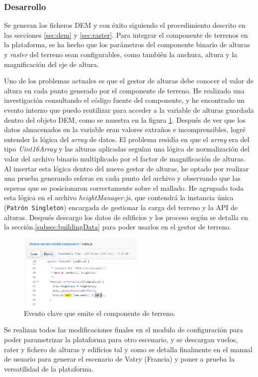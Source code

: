 \documentclass[a4paper, 11pt]{book}
\begin{document}
\subsubsection{Desarrollo}
Se generan los ficheros \textsc{DEM} y \emph{} con éxito siguiendo el procedimiento descrito en las secciones \ref{sec:dem} y \ref{sec:raster}. 
Para integrar el componente de terrenos en la plataforma, se ha hecho que los parámetros del componente binario de alturas y \emph{raster} del terreno sean configurables, como también la anchura, altura y la magnificación del eje de altura.

Uno de los problemas actuales es que el gestor de alturas debe conocer el valor de altura en cada punto generado por el componente de terreno. He realizado una investigación consultando el código fuente del componente, y he encontrado un evento interno que puedo reutilizar para acceder a la variable de alturas guardada dentro del objeto \textsc{DEM}, como se muestra en la figura \ref{fig:terrain_evento}. Después de ver que los datos almacenados en la variable eran valores extraños e incomprensibles, logré entender la lógica del \emph{array} de datos. 
El problema residía en que el \emph{array} era del tipo \emph{Uint16Array} y las alturas aplicadas seguían una lógica de normalización del valor del archivo binario multiplicado por el factor de magnificación de alturas. Al insertar esta lógica dentro del nuevo gestor de alturas, he optado por realizar una prueba generando esferas en cada punto del archivo y observando que las esperas que se posicionaron correctamente sobre el mallado.
He agrupado toda esta lógica en el archivo \emph{heightManager.js}, que contendrá la instancia única (\texttt{Patrón Singleton}) encargada de gestionar la carga del terreno y la \textsc{\gls{API}} de alturas.
Después descargo los datos de edificios y los proceso según se detalla en la sección.\ref{subsec:buildingData} para poder usarlos en el gestor de terreno.

\begin{figure}[h]
  \centering
  \includegraphics[width=6cm, keepaspectratio]{img/terrain_evento.jpg}
  \caption{Evento clave que emite el componente de terreno.}
  \label{fig:terrain_evento}
\end{figure}
Se realizan todos las modificaciones finales en el modulo de configuración para poder parametrizar la plataforma para otro escenario, y se descargan vuelos, rater y fichero de alturas y edificios tal y como se detalla finalmente en el manual de usuario para generar el escenario de Vatry (Francia) y poner a prueba la versatilidad de la plataforma.
\end{document}
